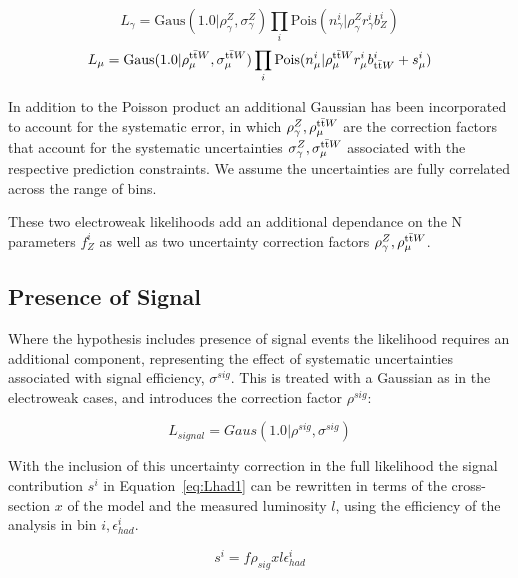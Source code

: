 \begin{equation}
L_{\gamma} = \textrm{Gaus}(1.0|\rho^{Z}_{\gamma}, \sigma^{Z}_{\gamma})  \prod_{i} \textrm{Pois}(n^{i}_{\gamma}|\rho^{Z}_{\gamma}r^{i}_{\gamma} b^{i}_{Z})
\label{eq:gaml}
\end{equation}
\begin{equation}
L_{\mu} = \textrm{Gaus}(1.0|\rho^{\textrm{t}\bar{\textrm{t}} W}_{\mu}, \sigma^{\textrm{t}\bar{\textrm{t}} W}_{\mu})  \prod_{i} \textrm{Pois}(n^{i}_{\mu}|\rho^{\textrm{t}\bar{\textrm{t}} W}_{\mu}r^{i}_{\mu} b^{i}_{\textrm{t}\bar{\textrm{t}} W} + s^{i}_{\mu})
  \label{eq:mul}
 \end{equation}


In addition to the Poisson product an additional Gaussian has been incorporated to account for the systematic error, in which $\rho^{Z}_{\gamma},\rho^{\textrm{t}\bar{\textrm{t}} W}_{\mu}$ are the correction factors that account for the systematic uncertainties $\sigma^{Z}_{\gamma},\sigma^{\textrm{t}\bar{\textrm{t}} W}_{\mu}$ associated with the respective prediction constraints. We assume the uncertainties are fully correlated across the range of bins. 

These two electroweak likelihoods add an additional dependance on the N parameters $f^{i}_{Z}$ as well as two uncertainty correction factors $\rho^{Z}_{\gamma},\rho^{\textrm{t}\bar{\textrm{t}} W}_{\mu}$. 

\subsection{Presence of Signal}

Where the hypothesis includes presence of signal events the likelihood requires an additional component, representing the effect of systematic uncertainties associated with signal efficiency, $\sigma^{sig}$. This is treated with a Gaussian as in the electroweak cases, and introduces the correction factor $\rho^{sig}$:

\begin{equation}
L_{signal} = Gaus(1.0 | \rho^{sig}, \sigma^{sig})
\label{ew:lsig}
\end{equation}

With the inclusion of this uncertainty correction in the full likelihood the signal contribution $s^{i}$ in Equation~\ref{eq:Lhad1} can be rewritten in terms of the cross-section $x$ of the model and the measured luminosity $l$, using the efficiency of the analysis in bin $i, \epsilon^{i}_{had}$. 

\begin{equation}
s^{i} = f \rho_{sig} x l \epsilon^{i}_{had}
\label{eq:sig}
\end{equation}

